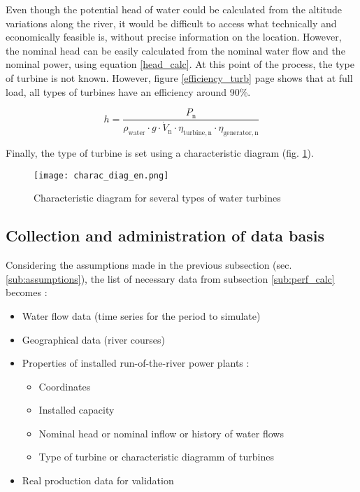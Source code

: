 Even though the potential head of water could be calculated from the altitude variations along the river, it would be difficult to access what technically and economically feasible is, without precise information on the location. However, the nominal head can be easily calculated from the nominal water flow and the nominal power, using equation \ref{head_calc}. At this point of the process, the type of turbine is not known. However, figure \ref{efficiency_turb} page \pageref{efficiency_turb} shows that at full load, all types of turbines have an efficiency around 90\%.

\begin{equation}
\label{head_calc} 
 h = \frac{P_\mathrm{n}}{\rho_\mathrm{water} \cdot g \cdot \dot{V}_\mathrm{n} \cdot \eta_\mathrm{turbine,n} \cdot \eta_\mathrm{generator,n}}
\end{equation}

Finally, the type of turbine is set using a characteristic diagram (fig. \ref{charac_diag}). 

\begin{figure}[H]
\texttt{[image: charac\_diag\_en.png]}
\caption[Characteristic diagram for several types of water turbines]{Characteristic diagram for several types of water turbines \cite{wiki_WK}}
\centering
\label{charac_diag}
\end{figure}

\subsection{Collection and administration of data basis}

Considering the assumptions made in the previous subsection (sec. \ref{sub:assumptions}), the list of necessary data from subsection \ref{sub:perf_calc} becomes :
\begin{itemize}
 \item Water flow data (time series for the period to simulate)
 \item Geographical data (river courses)
 \item Properties of installed run-of-the-river power plants :
 \begin{itemize}
  \item Coordinates
  \item Installed capacity
  \item Nominal head or nominal inflow or history of water flows
  \item Type of turbine or characteristic diagramm of turbines
 \end{itemize}
 \item Real production data for validation
\end{itemize}

